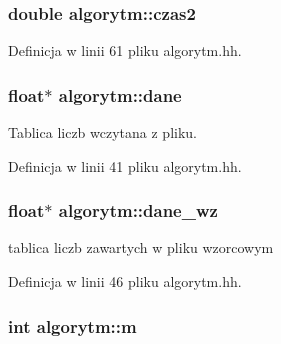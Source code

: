 \hypertarget{classalgorytm_abf8a655cd9b1acea00ba90893d38567b}{
\subsubsection[{czas2}]{\setlength{\rightskip}{0pt plus 5cm}double {\bf algorytm\-::czas2}}}\label{classalgorytm_abf8a655cd9b1acea00ba90893d38567b}


\-Definicja w linii 61 pliku algorytm.\-hh.

\hypertarget{classalgorytm_a5dd6d510b611002cfb9737f12eeff63f}{
\subsubsection[{dane}]{\setlength{\rightskip}{0pt plus 5cm}float$\ast$ {\bf algorytm\-::dane}}}\label{classalgorytm_a5dd6d510b611002cfb9737f12eeff63f}


\-Tablica liczb wczytana z pliku. 



\-Definicja w linii 41 pliku algorytm.\-hh.

\hypertarget{classalgorytm_a93fb0f7a64eb1e4f8492445395f98e5f}{
\subsubsection[{dane\-\_\-wz}]{\setlength{\rightskip}{0pt plus 5cm}float$\ast$ {\bf algorytm\-::dane\-\_\-wz}}}\label{classalgorytm_a93fb0f7a64eb1e4f8492445395f98e5f}


tablica liczb zawartych w pliku wzorcowym 



\-Definicja w linii 46 pliku algorytm.\-hh.

\hypertarget{classalgorytm_ac9429e88b0630a008df4d011458ee5a2}{
\subsubsection[{m}]{\setlength{\rightskip}{0pt plus 5cm}int {\bf algorytm\-::m}}}\label{classalgorytm_ac9429e88b0630a008df4d011458ee5a2}


